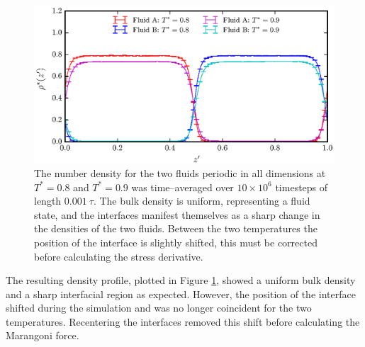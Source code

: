 \begin{figure}[h!]
\centering
\includegraphics[scale=1.0]{Period10Rho}
\caption{The number density for the two fluids periodic in all dimensions at $T^{*} = 0.8$ and $T^{*} = 0.9$ was time--averaged over $10 \times 10^{6}$ timesteps of length $0.001\ \tau$. 
The bulk density is uniform, representing a fluid state, and the interfaces manifest themselves as a sharp change in the densities of the two fluids.
Between the two temperatures the position of the interface is slightly shifted, this must be corrected before calculating the stress derivative.
}
\label{Period10Rho}
\end{figure}
The resulting density profile, plotted in Figure \ref{Period10Rho}, showed a uniform bulk density and a sharp interfacial region as expected.
However, the position of the interface shifted during the simulation and was no longer coincident for the two temperatures.
Recentering the interfaces removed this shift before calculating the Marangoni force.
\FloatBarrier

